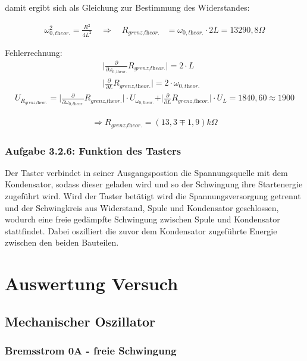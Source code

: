 \documentclass[a4paper]{scrartcl}
\numberwithin{equation}{subsection}
\begin{document}
damit ergibt sich als Gleichung zur Bestimmung des Widerstandes:

\begin{align}
\omega_{0,\textit{theor.}}^2 = \frac{R^2}{4L^2} \quad \Rightarrow \quad R_{\textit{grenz,theor.}} &= \omega_{0,\textit{theor.}} \cdot 2L = 13290,8 \Omega
\end{align}


Fehlerrechnung:
\begin{align*}
\vert \frac{\partial}{\partial \omega_{0,\textit{theor.}}}R_{\textit{grenz,theor.}}\vert = 2 \cdot L &\\
\vert \frac{\partial}{\partial L}R_{\textit{grenz,theor.}}\vert = 2 \cdot \omega_{0,\textit{theor.}} &
\end{align*}
\begin{align*}
U_{R_{\textit{grenz,theor.}}} = \vert \frac{\partial}{\partial \omega_{0,\textit{theor.}}}R_{\textit{grenz,theor.}}\vert \cdot U_{\omega_{0,\textit{theor.}}} + \vert \frac{\partial}{\partial L}R_{\textit{grenz,theor.}}\vert \cdot U_L = 1840,60 \approx 1900 
\end{align*}

\begin{align*}
\Rightarrow R_{\textit{grenz,theor.}} = (13,3 \mp 1,9) k \Omega
\end{align*}

\subsubsection{Aufgabe 3.2.6: Funktion des Tasters}
Der Taster verbindet in seiner Ausgangspostion die Spannungsquelle mit dem Kondensator, sodass dieser geladen wird und so der Schwingung ihre Startenergie zugeführt wird. Wird der Taster betätigt wird die Spannungsversorgung getrennt und der Schwingkreis aus Widerstand, Spule und Kondensator geschlossen, wodurch eine freie gedämpfte Schwingung zwischen Spule und Kondensator stattfindet. Dabei oszilliert die zuvor dem Kondensator zugeführte Energie zwischen den beiden Bauteilen.

\section{Auswertung Versuch}
\subsection{Mechanischer Oszillator}
\subsubsection{Bremsstrom 0A - freie Schwingung}
\end{document}
